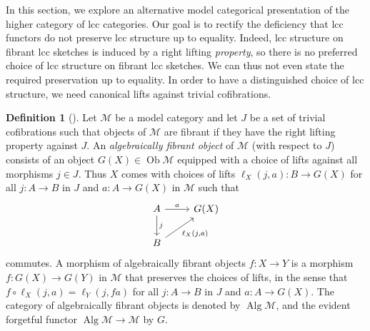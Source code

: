 \documentclass[a4paper]{article}
\theoremstyle{remark}
\theoremstyle{definition}
\newtheorem{definition}[theorem]{Definition}
\begin{document}
In this section, we explore an alternative model categorical presentation of the higher category of lcc categories.
Our goal is to rectify the deficiency that lcc functors do not preserve lcc structure up to equality.
Indeed, lcc structure on fibrant lcc sketches is induced by a right lifting \emph{property}, so there is no preferred choice of lcc structure on fibrant lcc sketches. 
We can thus not even state the required preservation up to equality.
In order to have a distinguished choice of lcc structure, we need canonical lifts against trivial cofibrations.

\begin{definition}[\cite{algebraic-models}]
  \label{def:algebraically-fibrant-objects}
  Let $\mathcal{M}$ be a model category and let $J$ be a set of trivial cofibrations such that objects of $\mathcal{M}$ are fibrant if they have the right lifting property against $J$.
  An \emph{algebraically fibrant object} of $\mathcal{M}$ (with respect to $J$) consists of an object $G(X) \in \operatorname{Ob} \mathcal{M}$ equipped with a choice of lifts against all morphisms $j \in J$.
  Thus $X$ comes with choices of lifts $\ell_X({j, a}) : B \rightarrow G(X)$ for all $j : A \rightarrow B$ in $J$ and $a : A \rightarrow G(X)$ in $\mathcal{M}$ such that
  \begin{equation}
    \begin{tikzcd}
      A \arrow[d, "j"] \arrow[r, "a"] & G(X) \\
      B \arrow[ur, "{\ell_X(j, a)}"']
    \end{tikzcd}
  \end{equation}
  commutes.
  A morphism of algebraically fibrant objects $f : X \rightarrow Y$ is a morphism $f : G(X) \rightarrow G(Y)$ in $\mathcal{M}$ that preserves the choices of lifts, in the sense that $f \circ \ell_X(j, a) = \ell_Y(j, fa)$ for all $j : A \rightarrow B$ in $J$ and $a : A \rightarrow G(X)$.
  The category of algebraically fibrant objects is denoted by $\operatorname{Alg} \mathcal{M}$, and the evident forgetful functor $\operatorname{Alg} \mathcal{M} \rightarrow \mathcal{M}$ by $G$.
\end{definition}
\end{document}
